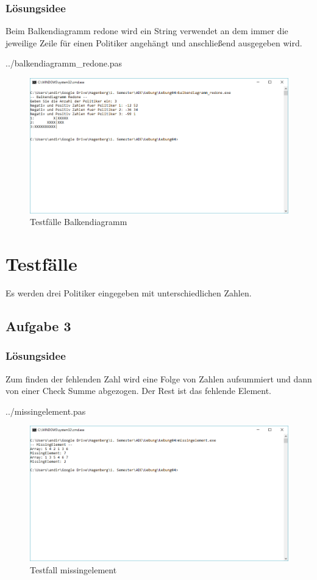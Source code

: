 \subsubsection*{Lösungsidee}
Beim Balkendiagramm redone wird ein String verwendet an dem immer die jeweilige Zeile für einen Politiker angehängt und anschließend ausgegeben wird.

 {../balkendiagramm_redone.pas}
\begin{figure}[H]
	\centering
	\includegraphics[scale=0.75]{./pictures/balkendiagramm_redone.png}
	\caption{Testfälle Balkendiagramm}
	\label{fig: Sortieralgorithmus}
\end{figure}

\section*{Testfälle}
Es werden drei Politiker eingegeben mit unterschiedlichen Zahlen.

\newpage

\subsection*{Aufgabe 3}
\subsubsection*{Lösungsidee}
Zum finden der fehlenden Zahl wird eine Folge von Zahlen aufsummiert und dann von einer Check Summe abgezogen. Der Rest ist das fehlende Element.

 {../missingelement.pas}
\begin{figure}[H]
	\centering
	\includegraphics[scale=0.75]{./pictures/missingelement.png}
	\caption{Testfall missingelement}
	\label{fig: label}
\end{figure}

